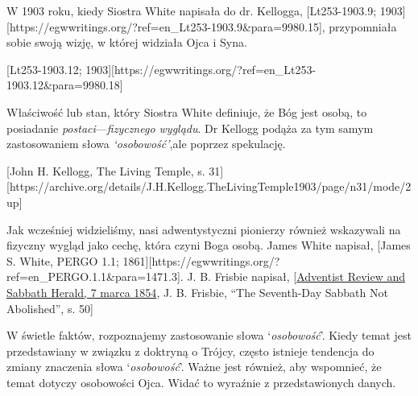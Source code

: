 W 1903 roku, kiedy Siostra White napisała do dr. Kellogga, [Lt253-1903.9; 1903][https://egwwritings.org/?ref=en\_Lt253-1903.9&para=9980.15], przypomniała sobie swoją wizję, w której widziała Ojca i Syna.

[Lt253-1903.12; 1903][https://egwwritings.org/?ref=en\_Lt253-1903.12&para=9980.18]





Właściwość lub stan, który Siostra White definiuje, że Bóg jest osobą, to posiadanie \textit{postaci}—\textit{fizycznego wyglądu}. Dr Kellogg podąża za tym samym zastosowaniem słowa \textit{‘osobowość’},ale poprzez spekulację.

[John H. Kellogg, The Living Temple, s. 31][https://archive.org/details/J.H.Kellogg.TheLivingTemple1903/page/n31/mode/2up]

Jak wcześniej widzieliśmy, nasi adwentystyczni pionierzy również wskazywali na fizyczny wygląd jako cechę, która czyni Boga osobą. James White napisał, [James S. White, PERGO 1.1; 1861][https://egwwritings.org/?ref=en\_PERGO.1.1&para=1471.3]. J. B. Frisbie napisał, [\href{https://documents.adventistarchives.org/Periodicals/RH/RH18540307-V05-07.pdf}{Adventist Review and Sabbath Herald, 7 marca 1854}, J. B. Frisbie, “The Seventh-Day Sabbath Not Abolished”, s. 50]

W świetle faktów, rozpoznajemy zastosowanie słowa ‘\textit{osobowość}’. Kiedy temat  jest przedstawiany w związku z doktryną o Trójcy, często istnieje tendencja do zmiany znaczenia słowa ‘\textit{osobowość}’. Ważne jest również, aby wspomnieć, że temat  dotyczy osobowości Ojca. Widać to wyraźnie  z przedstawionych danych.


